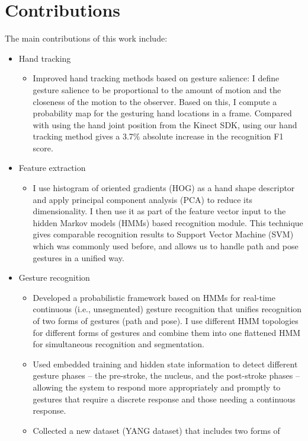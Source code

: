 \section{Contributions}
The main contributions of this work include:
\begin{itemize}
 \item Hand tracking
  \begin{itemize}
  \item Improved hand tracking methods based on gesture salience: I define
  gesture salience to be proportional to the amount of motion and the closeness
  of the motion to the observer. Based on this, I compute a probability map for the gesturing hand locations in a frame.  Compared with using the hand joint position from the Kinect SDK, using our hand tracking method gives a 3.7\% absolute increase in the recognition F1 score.
  \end{itemize}
 \item Feature extraction
  \begin{itemize}
  \item I use histogram of oriented gradients (HOG) as a hand shape descriptor
  and apply principal component analysis (PCA) to reduce its dimensionality. I
  then use it as part of the feature vector input to the hidden Markov models (HMMs) based recognition module. This technique gives comparable recognition results to Support Vector Machine (SVM) which was commonly used before, and allows us to handle path and pose gestures in a unified way.
  \end{itemize}
  \item Gesture recognition
    \begin{itemize}
    \item Developed a probabilistic framework based on HMMs for real-time
    continuous (i.e., unsegmented) gesture recognition that unifies recognition
    of two forms of gestures (path and pose). I use different HMM topologies for
    different forms of gestures and combine them into one flattened HMM for
    simultaneous recognition and segmentation.
    \item Used embedded training and hidden state information to detect
    different gesture phases -- the pre-stroke, the nucleus, and the post-stroke
    phases -- allowing the system to respond more appropriately and promptly to
    gestures that require a discrete response and those needing a continuous response.
    \item Collected a new dataset (YANG dataset) that includes two forms of

\end{itemize}
\end{itemize}
